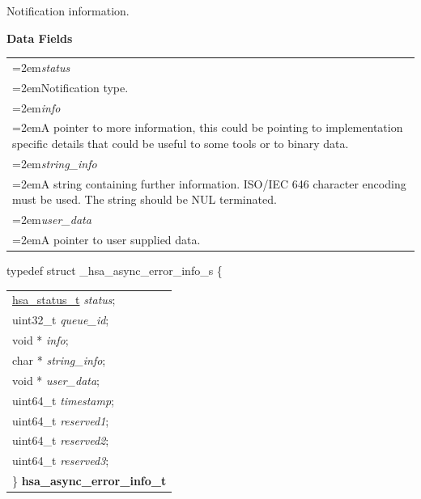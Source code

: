 \documentclass[final]{book}
\newcommand{\reffld}[1]{\textit{#1}}
\begin{document}
\begin{appendices}
\begin{tcolorbox}[breakable,nobeforeafter,arc=0mm,colframe=white,colback=lightgray,left=0mm]
\end{tcolorbox}
Notification information.

\noindent\textbf{Data Fields}\\[-6mm]
\begin{longtable}{@{}>{\hangindent=2em}p{\textwidth}}
\reffld{status}\\\hspace{2em}Notification type.\\[2mm]
\reffld{info}\\\hspace{2em}A pointer to more information, this could be pointing to implementation specific details that could be useful to some tools or to binary data.\\[2mm]
\reffld{string_info}\\\hspace{2em}A string containing further information. ISO/IEC 646 character encoding must be used. The string should be NUL terminated.\\[2mm]
\reffld{user_data}\\\hspace{2em}A pointer to user supplied data.
\end{longtable}



\noindent\begin{tcolorbox}[breakable,nobeforeafter,arc=0mm,colframe=white,colback=lightgray,left=0mm]
typedef struct  _hsa_async_error_info_s \{
\vspace{-3.5mm}\begin{longtable}{@{}p{\textwidth}}
\hspace{1.7em}\hyperlink{group--status-1gad755322e7ff95456520e8abdbe90d225}{hsa_status_t} \reffld{status};\\
\hspace{1.7em}uint32_t \reffld{queue_id};\\
\hspace{1.7em}void * \reffld{info};\\
\hspace{1.7em}char * \reffld{string_info};\\
\hspace{1.7em}void * \reffld{user_data};\\
\hspace{1.7em}uint64_t \reffld{timestamp};\\
\hspace{1.7em}uint64_t \reffld{reserved1};\\
\hspace{1.7em}uint64_t \reffld{reserved2};\\
\hspace{1.7em}uint64_t \reffld{reserved3};\\
\}  \hypertarget{group--status-1ga1e98022fc32cd651dc83c5f871e1a960}{\textbf{hsa_async_error_info_t}}
\end{longtable}


\end{tcolorbox}
\end{appendices}
\end{document}
